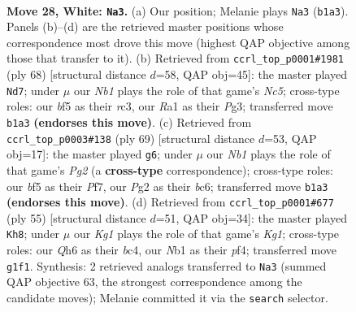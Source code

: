 \documentclass[11pt]{article}
\begin{document}
\clearpage

\begin{figure}[p]\centering
\begin{subfigure}{0.46\textwidth}\centering
\resizebox{\linewidth}{!}{%
\newchessgame
\chessboard[
  setfen={1r5r/7p/1p5Q/p3kb2/7P/8/PP3PP1/RN4K1 w - - 3 28},
  showmover=false,
  pgfstyle=straightmove, color=movearrow, markmove={b1-a3}
]}
\caption{}
\end{subfigure}\hfill
\begin{subfigure}{0.46\textwidth}\centering
\resizebox{\linewidth}{!}{%
\newchessgame
\chessboard[
  setfen={5rk1/4Rpb1/6p1/2NR4/8/1pr1P1P1/4PK1P/8 w - - 0 35},
  showmover=false,
  pgfstyle=straightmove, color=movearrow, markmove={c5-d7}
]}
\caption{}
\end{subfigure}
\\[4pt]
\begin{subfigure}{0.46\textwidth}\centering
\resizebox{\linewidth}{!}{%
\newchessgame
\chessboard[
  setfen={1r5k/4rppp/2B1n3/1P2R3/8/2p2P2/2K4P/4R3 b - - 2 35},
  showmover=false,
  pgfstyle=straightmove, color=movearrow, markmove={g7-g6}
]}
\caption{}
\end{subfigure}\hfill
\begin{subfigure}{0.46\textwidth}\centering
\resizebox{\linewidth}{!}{%
\newchessgame
\chessboard[
  setfen={r5k1/1p1r2pp/4p3/8/2B2P2/4b1P1/7P/1R3R1K b - - 1 28},
  showmover=false,
  pgfstyle=straightmove, color=movearrow, markmove={g8-h8}
]}
\caption{}
\end{subfigure}
\caption{\textbf{Move 28, White: \texttt{Na3}.} (a) Our position; Melanie plays \texttt{Na3} (\texttt{b1a3}). Panels (b)--(d) are the retrieved master positions whose correspondence most drove this move (highest QAP objective among those that transfer to it). (b) Retrieved from \texttt{ccrl\_top\_p0001\#1981} (ply 68) [structural distance $d$=58, QAP obj=45]: the master played \texttt{Nd7}; under $\mu$ our \emph{Nb1} plays the role of that game's \emph{Nc5}; cross-type roles: our \emph{b}f5 as their \emph{r}c3, our \emph{R}a1 as their \emph{P}g3; transferred move \texttt{b1a3} \textbf{(endorses this move)}. (c) Retrieved from \texttt{ccrl\_top\_p0003\#138} (ply 69) [structural distance $d$=53, QAP obj=17]: the master played \texttt{g6}; under $\mu$ our \emph{Nb1} plays the role of that game's \emph{Pg2} (a \textbf{cross-type} correspondence); cross-type roles: our \emph{b}f5 as their \emph{P}f7, our \emph{P}g2 as their \emph{b}c6; transferred move \texttt{b1a3} \textbf{(endorses this move)}. (d) Retrieved from \texttt{ccrl\_top\_p0001\#677} (ply 55) [structural distance $d$=51, QAP obj=34]: the master played \texttt{Kh8}; under $\mu$ our \emph{Kg1} plays the role of that game's \emph{Kg1}; cross-type roles: our \emph{Q}h6 as their \emph{b}c4, our \emph{N}b1 as their \emph{p}f4; transferred move \texttt{g1f1}. Synthesis: 2 retrieved analogs transferred to \texttt{Na3} (summed QAP objective 63, the strongest correspondence among the candidate moves); Melanie committed it via the \texttt{search} selector.}
\label{fig:thought-m54}
\end{figure}
\end{document}
